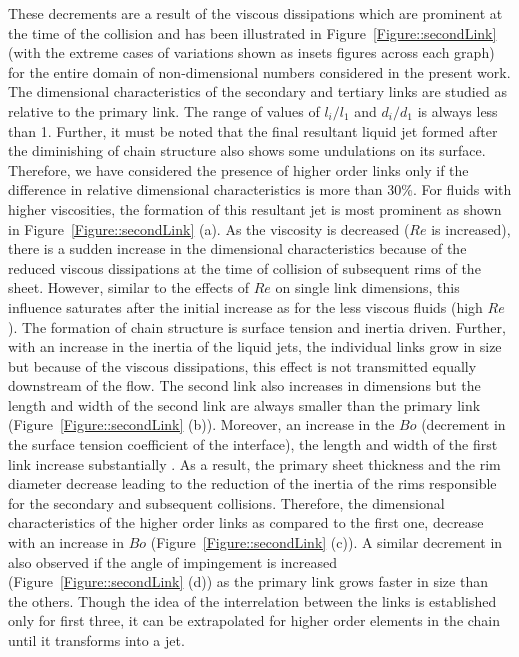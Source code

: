 These decrements are a result of the viscous dissipations which are prominent at the time of the collision and has been illustrated in Figure~\ref{Figure::secondLink} (with the extreme cases of variations shown as insets figures across each graph) for the entire domain of non-dimensional numbers considered in the present work. The dimensional characteristics of the secondary and tertiary links are studied as relative to the primary link. The range of values of $l_i/l_1$ and $d_i/d_1$ is always less than 1. Further, it must be noted that the final resultant liquid jet formed after the diminishing of chain structure also shows some undulations on its surface. Therefore, we have considered the presence of higher order links only if the difference in relative dimensional characteristics is more than 30$\%$. For fluids with higher viscosities, the formation of this resultant jet is most prominent as shown in Figure~\ref{Figure::secondLink} (a). As the viscosity is decreased ($Re$ is increased), there is a sudden increase in the dimensional characteristics because of the reduced viscous dissipations at the time of collision of subsequent rims of the sheet. However, similar to the effects of $Re$ on single link dimensions, this influence saturates after the initial increase as for the less viscous fluids (high $Re$). The formation of chain structure is surface tension and inertia driven. Further, with an increase in the inertia of the liquid jets, the individual links grow in size but because of the viscous dissipations, this effect is not transmitted equally downstream of the flow. The second link also increases in dimensions but the length and width of the second link are always smaller than the primary link (Figure~\ref{Figure::secondLink} (b)). Moreover, an increase in the $Bo$ (decrement in the surface tension coefficient of the interface), the length and width of the first link increase substantially \citep{yang2014liquid,bremond2006atomization}. As a result, the primary sheet thickness and the rim diameter decrease leading to the reduction of the inertia of the rims responsible for the secondary and subsequent collisions. Therefore, the dimensional characteristics of the higher order links as compared to the first one, decrease with an increase in $Bo$ (Figure~\ref{Figure::secondLink} (c)). A similar decrement in also observed if the angle of impingement is increased (Figure~\ref{Figure::secondLink} (d)) as the primary link grows faster in size than the others. Though the idea of the interrelation between the links is established only for first three, it can be extrapolated for higher order elements in the chain until it transforms into a jet.
